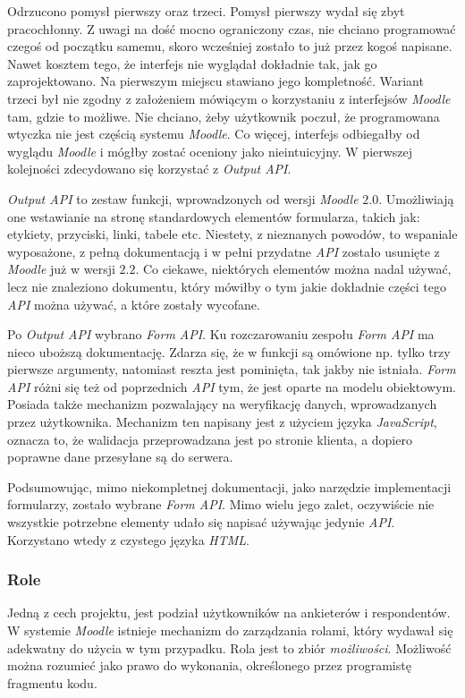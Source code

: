Odrzucono pomysł pierwszy oraz trzeci. Pomysł pierwszy wydał się zbyt pracochłonny. Z uwagi na dość mocno ograniczony czas, nie chciano programować czegoś od początku samemu, skoro wcześniej zostało to już przez kogoś napisane. Nawet kosztem tego, że interfejs nie wyglądał dokładnie tak, jak go zaprojektowano. Na pierwszym miejscu stawiano jego kompletność. Wariant trzeci był nie zgodny z założeniem mówiącym o korzystaniu z interfejsów \emph{Moodle} tam, gdzie to możliwe. Nie chciano, żeby użytkownik poczuł, że programowana wtyczka nie jest częścią systemu \emph{Moodle}. Co więcej, interfejs odbiegałby od wyglądu \emph{Moodle} i mógłby zostać oceniony jako nieintuicyjny. W pierwszej kolejności zdecydowano się korzystać z \emph{Output API}.

\emph{Output API} to zestaw funkcji, wprowadzonych od wersji \emph{Moodle} $2.0$. Umożliwiają one wstawianie na stronę standardowych elementów formularza, takich jak: etykiety, przyciski, linki, tabele etc. Niestety, z nieznanych powodów, to wspaniale wyposażone, z pełną dokumentacją i w pełni przydatne \emph{API} zostało usunięte z \emph{Moodle} już w wersji $2.2$. Co ciekawe, niektórych elementów można nadal używać, lecz nie znaleziono dokumentu, który mówiłby o tym jakie dokładnie części tego \emph{API} można używać, a które zostały wycofane.

Po \emph{Output API} wybrano \emph{Form API}. Ku rozczarowaniu zespołu \emph{Form API} ma nieco uboższą dokumentację. Zdarza się, że w funkcji są omówione np. tylko trzy pierwsze argumenty, natomiast reszta jest pominięta, tak jakby nie istniała. \emph{Form API} różni się też od poprzednich \emph{API} tym, że jest oparte na modelu obiektowym. Posiada także mechanizm pozwalający na weryfikację danych, wprowadzanych przez użytkownika. Mechanizm ten napisany jest z użyciem języka \emph{JavaScript}, oznacza to, że walidacja przeprowadzana jest po stronie klienta, a dopiero poprawne dane przesyłane są do serwera.

Podsumowując, mimo niekompletnej dokumentacji, jako narzędzie implementacji formularzy, zostało wybrane \emph{Form API}. Mimo wielu jego zalet, oczywiście nie wszystkie potrzebne elementy udało się napisać używając jedynie \emph{API}. Korzystano wtedy z czystego języka \emph{HTML}. 

\subsubsection{Role}
Jedną z cech projektu, jest podział użytkowników na ankieterów i respondentów. W systemie \emph{Moodle} istnieje mechanizm do zarządzania rolami, który wydawał się adekwatny do użycia w tym przypadku. Rola jest to zbiór \emph{możliwości}. Możliwość można rozumieć jako prawo do wykonania, określonego przez programistę fragmentu kodu.

